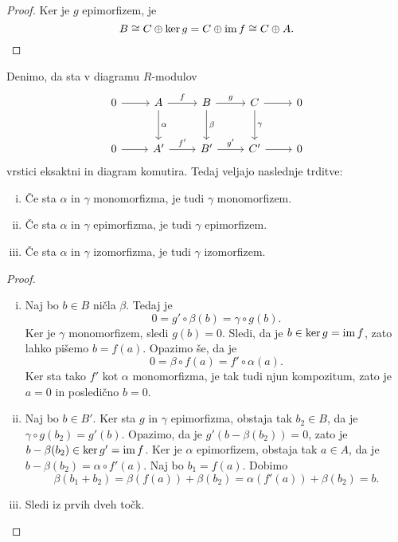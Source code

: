 \begin{proof}
Ker je $g$ epimorfizem, je
\[
B \cong C \oplus \ker g = C \oplus \operatorname{im} f \cong C \oplus A. \qedhere
\]
\end{proof}

\begin{izrek}
Denimo, da sta v diagramu $R$-modulov
\[
\begin{tikzcd}[row sep=large]
0 \arrow[r] &
A \arrow[r, "f"] \arrow[d, "\alpha"] &
B \arrow[r, "g"] \arrow[d, "\beta"] &
C \arrow[r] \arrow[d, "\gamma"] & 0
\\
0 \arrow[r] &
A' \arrow[r, "f'"] &
B' \arrow[r, "g'"] &
C' \arrow[r] & 0
\end{tikzcd}
\]
vrstici eksaktni in diagram komutira. Tedaj veljajo naslednje
trditve:

\begin{enumerate}[i)]
\item Če sta $\alpha$ in $\gamma$ monomorfizma, je tudi $\gamma$
monomorfizem.
\item Če sta $\alpha$ in $\gamma$ epimorfizma, je tudi $\gamma$
epimorfizem.
\item Če sta $\alpha$ in $\gamma$ izomorfizma, je tudi $\gamma$
izomorfizem.
\end{enumerate}
\end{izrek}

\begin{proof}
\phantom{a}
\begin{enumerate}[i)]
\item Naj bo $b \in B$ ničla $\beta$. Tedaj je
\[
0 = g' \circ \beta (b) = \gamma \circ g(b).
\]
Ker je $\gamma$ monomorfizem, sledi $g(b) = 0$. Sledi, da je
$b \in \ker g = \operatorname{im} f$, zato lahko pišemo $b = f(a)$. Opazimo še,
da je
\[
0 = \beta \circ f(a) = f' \circ \alpha(a).
\]
Ker sta tako $f'$ kot $\alpha$ monomorfizma, je tak tudi njun
kompozitum, zato je $a = 0$ in posledično $b = 0$.

\item Naj bo $b \in B'$. Ker sta $g$ in $\gamma$ epimorfizma,
obstaja tak $b_2 \in B$, da je $\gamma \circ g(b_2) = g'(b)$.
Opazimo, da je $g'(b - \beta(b_2)) = 0$, zato je
$b - \beta(b_2) \in \ker g' = \operatorname{im} f$. Ker je $\alpha$ epimorfizem,
obstaja tak $a \in A$, da je $b - \beta(b_2) = \alpha \circ f'(a)$.
Naj bo $b_1 = f(a)$. Dobimo
\[
\beta(b_1 + b_2) =
\beta(f(a)) + \beta(b_2) =
\alpha(f'(a)) + \beta(b_2) = b.
\]
\item Sledi iz prvih dveh točk. \qedhere
\end{enumerate}
\end{proof}

